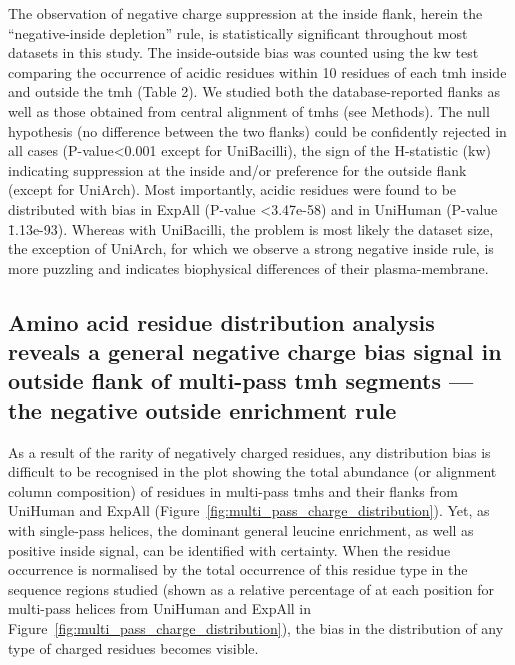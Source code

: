 The observation of negative charge suppression at the inside flank, herein the “negative-inside depletion” rule, is statistically significant throughout most datasets in this study. The inside-outside bias was counted using the \gls{kw} test comparing the occurrence of acidic residues within 10 residues of each \gls{tmh} inside and outside the \gls{tmh} (Table 2). We studied both the database-reported flanks as well as those obtained from central alignment of \gls{tmh}s (see Methods). The null hypothesis (no difference between the two flanks) could be confidently rejected in all cases (P-value<0.001 except for UniBacilli), the sign of the H-statistic (\gls{kw}) indicating suppression at the inside and/or preference for the outside flank (except for UniArch). Most importantly, acidic residues were found to be distributed with bias in ExpAll (P-value <3.47e-58) and in UniHuman (P-value \= 1.13e-93). Whereas with UniBacilli, the problem is most likely the dataset size, the exception of UniArch, for which we observe a strong negative inside rule, is more puzzling and indicates biophysical differences of their plasma-membrane.

\subsection{Amino acid residue distribution analysis reveals a general negative charge bias signal in outside flank of multi-pass \gls{tmh} segments --- the negative outside enrichment rule}

As a result of the rarity of negatively charged residues, any distribution bias is difficult to be recognised in the plot showing the total abundance (or alignment column composition) of residues in multi-pass \gls{tmh}s and their flanks from UniHuman and ExpAll (Figure~\ref{fig:multi_pass_charge_distribution}). Yet, as with single-pass helices, the dominant general leucine enrichment, as well as positive inside signal, can be identified with certainty. When the residue occurrence is normalised by the total occurrence of this residue type in the sequence regions studied (shown as a relative percentage of at each position for multi-pass helices from UniHuman and ExpAll  in Figure~\ref{fig:multi_pass_charge_distribution}), the bias in the distribution of any type of charged residues becomes visible.

